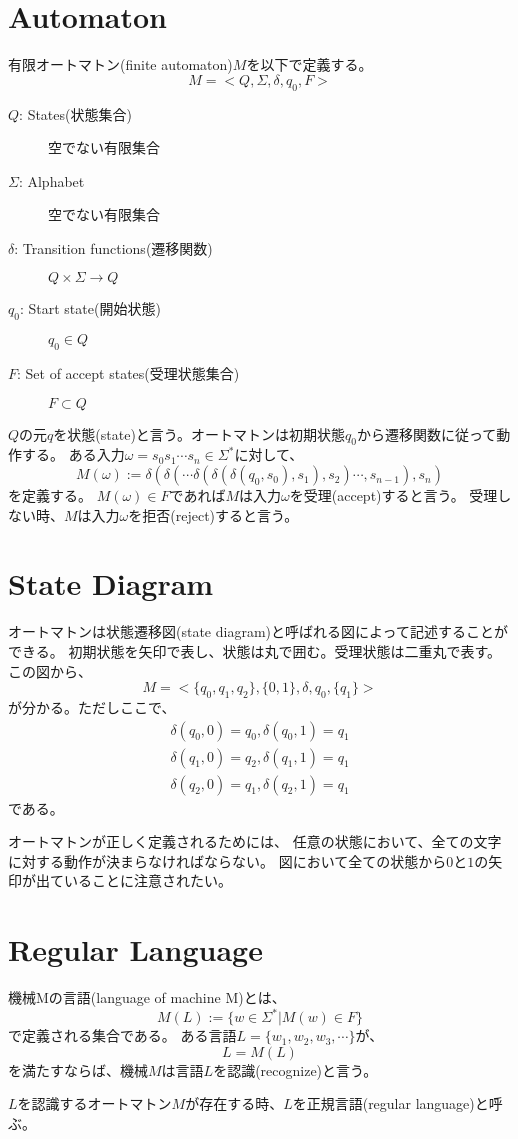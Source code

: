 \documentclass[b5paper,fleqn]{ltjsarticle}
\newcommand\al[1]{\begin{align*}#1\end{align*}}
\begin{document}
\section{Automaton}
有限オートマトン(finite automaton)$M$を以下で定義する。
\[M=<Q,\Sigma,\delta,q_0,F>\]
\begin{description}
\item[$Q$: States(状態集合)] 空でない有限集合
\item[$\Sigma$: Alphabet] 空でない有限集合
\item[$\delta$: Transition functions(遷移関数)] $Q\times\Sigma\rightarrow Q$
\item[$q_0$: Start state(開始状態)] $q_0\in Q$
\item[$F$: Set of accept states(受理状態集合)] $F\subset Q$
\end{description}
$Q$の元$q$を状態(state)と言う。オートマトンは初期状態$q_0$から遷移関数に従って動作する。
ある入力$\omega=s_0s_1\cdots s_n\in\Sigma^*$に対して、
\[M(\omega):=\delta(\delta(\cdots\delta(\delta(\delta(q_0,s_0),s_1),s_2)\cdots,s_{n-1}),s_n)\]を定義する。
$M(\omega)\in F$であれば$M$は入力$\omega$を受理(accept)すると言う。
受理しない時、$M$は入力$\omega$を拒否(reject)すると言う。

\section{State Diagram}
オートマトンは状態遷移図(state diagram)と呼ばれる図によって記述することができる。
初期状態を矢印で表し、状態は丸で囲む。受理状態は二重丸で表す。
\vskip10pt
\vskip5pt
この図から、
\[M=<\{q_0,q_1,q_2\},\{0,1\},\delta,q_0,\{q_1\}>\]
が分かる。ただしここで、
\al{\delta(q_0,0)=q_0, \delta(q_0,1)=q_1\\
\delta(q_1,0)=q_2, \delta(q_1,1)=q_1\\
\delta(q_2,0)=q_1, \delta(q_2,1)=q_1
}である。\par
オートマトンが正しく定義されるためには、
任意の状態において、全ての文字に対する動作が決まらなければならない。
図において全ての状態から$0$と$1$の矢印が出ていることに注意されたい。

\section{Regular Language}
機械Mの言語(language of machine M)とは、
\[M(L):=\{w\in \Sigma^*|M(w)\in F\}\]
で定義される集合である。
ある言語$L=\{w_1,w_2,w_3,\cdots\}$が、
\[L=M(L)\]
を満たすならば、機械$M$は言語$L$を認識(recognize)と言う。\par
$L$を認識するオートマトン$M$が存在する時、$L$を正規言語(regular language)と呼ぶ。
\end{document}
